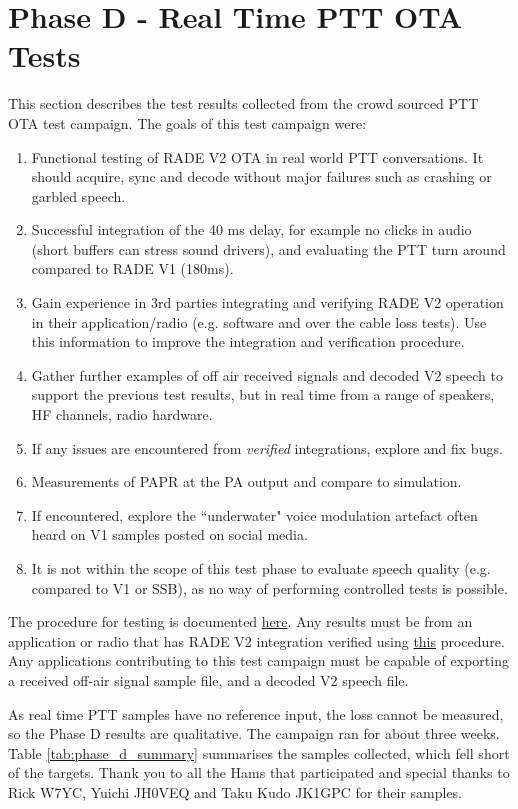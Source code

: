\documentclass{article}
\begin{document}
\section{Phase D - Real Time PTT OTA Tests}

This section describes the test results collected from the crowd sourced PTT OTA test campaign. The goals of this test campaign were:
\begin{enumerate}
\item Functional testing of RADE V2 OTA in real world PTT conversations.  It should acquire, sync and decode without major failures such as crashing or garbled speech.
\item Successful integration of the 40 \si{ms} delay, for example no clicks in audio (short buffers can stress sound drivers), and evaluating the PTT turn around compared to RADE V1 (180ms).
\item Gain experience in 3rd parties integrating and verifying RADE V2 operation in their application/radio (e.g. software and over the cable loss tests). Use this information to improve the integration and verification procedure.
\item Gather further examples of off air received signals and decoded V2 speech to support the previous test results, but in real time from a range of speakers, HF channels, radio hardware.
\item If any issues are encountered from \emph{verified} integrations, explore and fix bugs.
\item Measurements of PAPR at the PA output and compare to simulation.
\item If encountered, explore the ``underwater" voice modulation artefact often heard on V1 samples posted on social media.
\item It is not within the scope of this test phase to evaluate speech quality (e.g. compared to V1 or SSB), as no way of performing controlled tests is possible.
\end{enumerate}

The procedure for testing is documented \href{https://github.com/drowe67/radae/#testing-rade}{here}.  Any results must be from an application or radio that has RADE V2 integration verified using \href{https://github.com/drowe67/radae/#verifying-rade-integration}{this} procedure.  Any applications contributing to this test campaign must be capable of exporting a received off-air signal sample file, and a decoded V2 speech file.

As real time PTT samples have no reference input, the loss cannot be measured, so the Phase D results are qualitative.  The campaign ran for about three weeks.  Table \ref{tab:phase_d_summary} summarises the samples collected, which fell short of the targets.  Thank you to all the Hams that participated and special thanks to Rick W7YC, Yuichi JH0VEQ and Taku Kudo JK1GPC for their samples.
\end{document}
